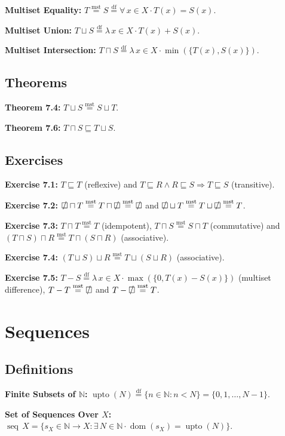 \documentclass[12pt]{article}
\newcommand{\dfeq}{\stackrel{\text{df}}{=}}
\newcommand{\msteq}{\stackrel{\text{mst}}{=}}
\newcommand{\sqemptyset}{\ensurestackMath{\stackinset{c}{}{c}{}{/}{\square}}}
\DeclareMathOperator{\jseq}{seq}
\DeclareMathOperator{\jdom}{dom}
\DeclareMathOperator{\jupto}{upto}
\theoremstyle{plain}
\begin{document}
\textbf{Multiset Equality:} $T \msteq S \dfeq \forall\, x \in X
\cdot T(x) = S(x)$.

\textbf{Multiset Union:} $T \sqcup S \dfeq \lambda\, x \in X
\cdot T(x) + S(x)$.

\textbf{Multiset Intersection:} $T \sqcap S \dfeq \lambda\, x
\in X \cdot \min(\{T(x), S(x)\})$.

\subsection{Theorems}

\textbf{Theorem 7.4:} $T \sqcup S \msteq S \sqcup T$.

\textbf{Theorem 7.6:} $T \sqcap S \sqsubseteq T \sqcup S$.

\subsection{Exercises}

\textbf{Exercise 7.1:} $T \sqsubseteq T$ (reflexive) and $T
\sqsubseteq R \land R \sqsubseteq S \Rightarrow T \sqsubseteq S$
(transitive).

\textbf{Exercise 7.2:} $\sqemptyset \sqcap T \msteq T \sqcap
\sqemptyset \msteq \sqemptyset$ and $\sqemptyset \sqcup T \msteq
T \sqcup \sqemptyset \msteq T$.

\textbf{Exercise 7.3:} $T \sqcap T \msteq T$ (idempotent), $T
\sqcap S \msteq S \sqcap T$ (commutative) and $(T \sqcap S)
\sqcap R \msteq T \sqcap (S \sqcap R)$ (associative).

\textbf{Exercise 7.4:} $(T \sqcup S)
\sqcup R \msteq T \sqcup (S \sqcup R)$ (associative).

\textbf{Exercise 7.5:} $T - S \dfeq \lambda\, x \in X \cdot
\max(\{0, T(x) - S(x)\})$ (multiset difference), $T - T \msteq
\sqemptyset$ and $T - \sqemptyset \msteq T$.

\section{Sequences}

\subsection{Definitions}

\textbf{Finite Subsets of $\mathbb{N}$:} $\jupto(N)
\dfeq \{n \in \mathbb{N} : n < N\} = \{0, 1, \ldots, N - 1\}$.

\textbf{Set of Sequences Over $X$:} $\jseq\, X = \{s_X \in
\mathbb{N} \rightarrow X : \exists\, N \in \mathbb{N} \cdot
\jdom(s_X) = \jupto(N)\}$.
\end{document}
